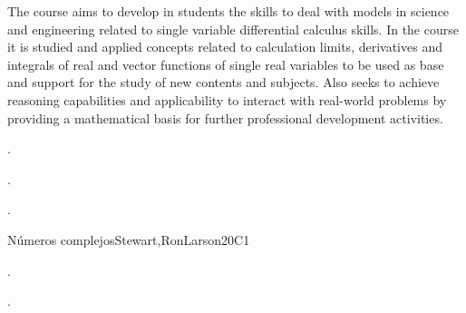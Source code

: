 \begin{syllabus}


\begin{justification}
The course aims to develop in students the skills to deal with models in science and engineering related to
single variable differential calculus skills. In the course it is studied and applied concepts related to calculation
limits, derivatives and integrals of real and vector functions of single real variables to be used as base and
support for the study of new contents and subjects. Also seeks to achieve reasoning capabilities and
applicability to interact with real-world problems by providing a mathematical basis for further professional
development activities.
\end{justification}

\begin{goals}
\item . %
\item . %
\item . %

\end{goals}

\begin{outcomes}
    \item {}
    \item {}
\end{outcomes}

\begin{competences}
    \item {}
    \item {}
    \item {}
\end{competences}

\begin{unit}{}{Números complejos}{Stewart,RonLarson}{20}{C1}
   \begin{topics}
    \item . %
    \item . %
   \end{topics}


\end{unit}
\end{syllabus}
